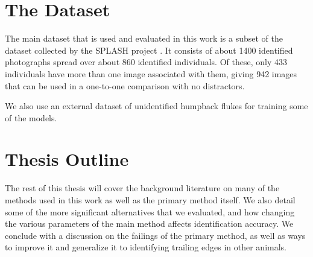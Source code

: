 
\section{The Dataset}

The main dataset that is used and evaluated in this work is a subset of the dataset collected by the SPLASH project \cite{calambokidis2008splash}. 
It consists of about 1400 identified photographs spread over about 860 identified individuals.
Of these, only 433 individuals have more than one image associated with them, giving 942 images that can be used in a one-to-one comparison with no distractors.

We also use an external dataset of unidentified humpback flukes for training some of the models.

\section{Thesis Outline}

The rest of this thesis will cover the background literature on many of the methods used in this work as well as the primary method itself.
We also detail some of the more significant alternatives that we evaluated, and how changing the various parameters of the main method affects identification accuracy.
We conclude with a discussion on the failings of the primary method, as well as ways to improve it and generalize it to identifying trailing edges in other animals.





